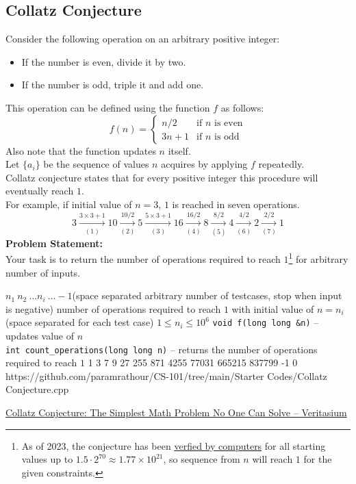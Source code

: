 \documentclass[../../Problems]{subfiles}
\begin{document}
\subsection{Collatz Conjecture}
Consider the following operation on an arbitrary positive integer:
\begin{itemize}
	\item If the number is even, divide it by two.
	\item If the number is odd, triple it and add one.
\end{itemize}
This operation can be defined using the function $f$ as follows:
\begin{equation}
f(n) = \begin{cases}
	n/2 & \text{if $n$ is even}\\
	3n+1 & \text{if $n$ is odd}
\end{cases}
\end{equation}
Also note that the function updates $n$ itself.\\
Let $\{a_i\}$ be the sequence of values $n$ acquires by applying $f$ repeatedly.\\
Collatz conjecture states that for every positive integer this procedure will eventually reach $1$.\\
For example, if initial value of $n=3$, $1$ is reached in seven operations.
\begin{equation*}
3\xrightarrow[(1)]{3\times3+1}10\xrightarrow[(2)]{10/2}5\xrightarrow[(3)]{5\times3+1}16\xrightarrow[(4)]{16/2}8\xrightarrow[(5)]{8/2}4\xrightarrow[(6)]{4/2}2\xrightarrow[(7)]{2/2}1
\end{equation*}
\textbf{Problem Statement:}\\
Your task is to return the number of operations required to reach $1$\footnote{As of 2023, the conjecture has been \href{https://www.reddit.com/r/numbertheory/comments/17mxkud}{verfied by computers} for all starting values up to $1.5\cdot2^{70} \approx 1.77 \times 10^{21}$, so sequence from $n$ will reach $1$ for the given constraints.} for arbitrary number of inputs.
\begin{testcasesFunction}
	{$n_1\ n_2\ \ldots n_i\ \ldots -1$\hfill(space separated arbitrary number of testcases, stop when input is negative)}
	{number of operations required to reach $1$ with initial value of $n = n_i$ \hfill(space separated for each test case)}
	{$1 \leq n_i \leq 10^{6}$}
	{\texttt{void f(long long \&n)} -- updates value of $n$\\
	\texttt{int count\_operations(long long n)} -- returns the number of operations required to reach $1$}
	{1 3 7 9 27 255 871 4255 77031 665215 837799 -1}
	{0}
	{https://github.com/paramrathour/CS-101/tree/main/Starter Codes/Collatz Conjecture.cpp}
\end{testcasesFunction}
\begin{funvideo}
\href{https://youtu.be/094y1Z2wpJg}{Collatz Conjecture: The Simplest Math Problem No One Can Solve -- Veritasium}
\end{funvideo}
\end{document}
